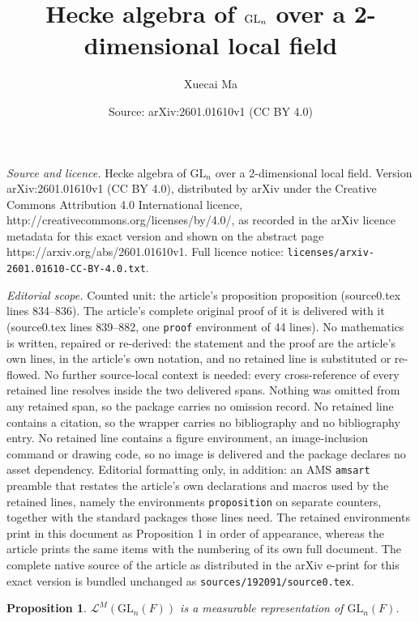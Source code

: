 \documentclass[10pt,a4paper]{amsart}
\title{Hecke algebra of $\GL_n$ over a 2-dimensional local field}
\author{Xuecai Ma}
\date{Source: arXiv:2601.01610v1 (CC BY 4.0)}
\newtheorem{proposition}{Proposition}
\def  \GL        {\mathrm{GL}}
\def  \cl       {\mathcal{L}}
\begin{document}
\maketitle

\noindent\emph{Source and licence.} Hecke algebra of $\GL_n$ over a 2-dimensional local field. Version arXiv:2601.01610v1 (CC BY 4.0), distributed by arXiv under the Creative Commons Attribution 4.0 International licence, http://creativecommons.org/licenses/by/4.0/, as recorded in the arXiv licence metadata for this exact version and shown on the abstract page https://arxiv.org/abs/2601.01610v1. Full licence notice: \texttt{licenses/arxiv-2601.01610-CC-BY-4.0.txt}.\par\smallskip

\noindent\textit{Editorial scope.} Counted unit: the article's proposition proposition (source0.tex lines 834--836). The article's complete original proof of it is delivered with it (source0.tex lines 839--882, one \texttt{proof} environment of 44 lines). No mathematics is written, repaired or re-derived: the statement and the proof are the article's own lines, in the article's own notation, and no retained line is substituted or re-flowed.  No further source-local context is needed: every cross-reference of every retained line resolves inside the two delivered spans.  Nothing was omitted from any retained span, so the package carries no omission record.  No retained line contains a citation, so the wrapper carries no bibliography and no bibliography entry.  No retained line contains a figure environment, an image-inclusion command or drawing code, so no image is delivered and the package declares no asset dependency.  Editorial formatting only, in addition: an AMS \texttt{amsart} preamble that restates the article's own declarations and macros used by the retained lines, namely the environments \texttt{proposition} on separate counters, together with the standard packages those lines need.  The retained environments print in this document as Proposition 1 in order of appearance, whereas the article prints the same items with the numbering of its own full document.  The complete native source of the article as distributed in the arXiv e-print for this exact version is bundled unchanged as \texttt{sources/192091/source0.tex}.
\begin{proposition}
 $\cl^M( \GL_n(F))$ is a measurable representation  of $\GL_n(F)$.
\end{proposition}
\end{document}
